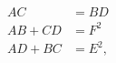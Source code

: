 \begin{equation} \label{three-relations}
  \begin{array}{rl}
AC &= BD \\
AB + CD &= F^2 \\
AD + BC &= E^2,
  \end{array}
\end{equation}

